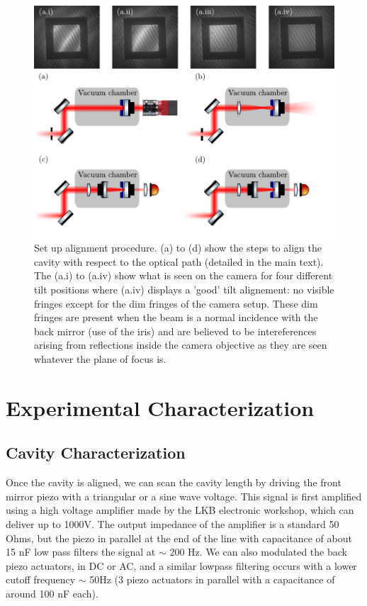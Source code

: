 \begin{figure}[h!]
    \centering  
    \includegraphics[width=\textwidth]{./chap5/fig/tilt_alignementB.pdf}
    \caption{Set up alignment procedure. (a) to (d) show the steps to align the cavity with respect to the optical path (detailed in the main text). The (a.i) to (a.iv) show what is seen on the camera for four different tilt positions where (a.iv) displays a 'good' tilt alignement: no visible fringes except for the dim fringes of the camera setup. These dim fringes are present when the beam is a normal incidence with the back mirror (use of the iris) and are believed to be intereferences arising from reflections inside the camera objective as they are seen whatever the plane of focus is. }
    \label{fig:tilt}
\end{figure}
\section{Experimental Characterization}
\subsection{Cavity Characterization}
Once the cavity is aligned, we can scan the cavity length by driving the front mirror piezo with a triangular or a sine wave voltage. This signal is first amplified using a high voltage amplifier made by the LKB electronic workshop, which can deliver up to 1000V. The output impedance of the amplifier is a standard 50 Ohms, but the piezo in parallel at the end of the line with capacitance of about 15 nF low pass filters the signal at  $\sim$ 200 Hz. We can also modulated the back piezo actuators, in DC or AC, and a similar lowpass filtering occurs with a lower cutoff frequency $\sim$ 50Hz (3 piezo actuators in parallel with a capacitance of around 100 nF each). 

